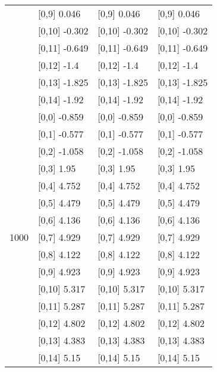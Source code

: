 \begin{table}
\begin{tabular}[t]{llll}
 & {}[0,9] 0.046 & {}[0,9] 0.046 & {}[0,9] 0.046\\
\addlinespace
 & {}[0,10] -0.302 & {}[0,10] -0.302 & {}[0,10] -0.302\\
 & {}[0,11] -0.649 & {}[0,11] -0.649 & {}[0,11] -0.649\\
 & {}[0,12] -1.4 & {}[0,12] -1.4 & {}[0,12] -1.4\\
 & {}[0,13] -1.825 & {}[0,13] -1.825 & {}[0,13] -1.825\\
 & {}[0,14] -1.92 & {}[0,14] -1.92 & {}[0,14] -1.92\\
\addlinespace
 & {}[0,0] -0.859 & {}[0,0] -0.859 & {}[0,0] -0.859\\
 & {}[0,1] -0.577 & {}[0,1] -0.577 & {}[0,1] -0.577\\
 & {}[0,2] -1.058 & {}[0,2] -1.058 & {}[0,2] -1.058\\
 & {}[0,3] 1.95 & {}[0,3] 1.95 & {}[0,3] 1.95\\
 & {}[0,4] 4.752 & {}[0,4] 4.752 & {}[0,4] 4.752\\
\addlinespace
 & {}[0,5] 4.479 & {}[0,5] 4.479 & {}[0,5] 4.479\\
 & {}[0,6] 4.136 & {}[0,6] 4.136 & {}[0,6] 4.136\\
1000 & {}[0,7] 4.929 & {}[0,7] 4.929 & {}[0,7] 4.929\\
 & {}[0,8] 4.122 & {}[0,8] 4.122 & {}[0,8] 4.122\\
 & {}[0,9] 4.923 & {}[0,9] 4.923 & {}[0,9] 4.923\\
\addlinespace
 & {}[0,10] 5.317 & {}[0,10] 5.317 & {}[0,10] 5.317\\
 & {}[0,11] 5.287 & {}[0,11] 5.287 & {}[0,11] 5.287\\
 & {}[0,12] 4.802 & {}[0,12] 4.802 & {}[0,12] 4.802\\
 & {}[0,13] 4.383 & {}[0,13] 4.383 & {}[0,13] 4.383\\
 & {}[0,14] 5.15 & {}[0,14] 5.15 & {}[0,14] 5.15\\
\bottomrule
\end{tabular}
\end{table}
